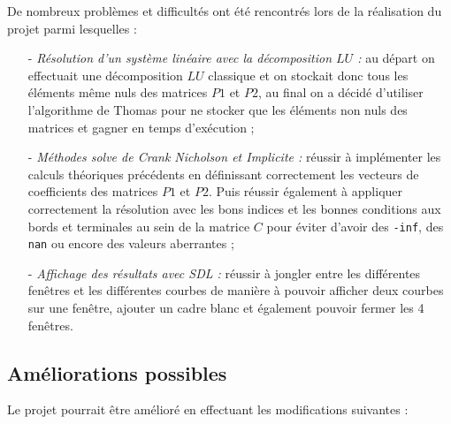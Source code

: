 \documentclass[11pt,a4paper]{article}
\begin{document}
\noindent
De nombreux problèmes et difficultés ont été rencontrés lors de la réalisation du projet parmi lesquelles :

\vspace{0.5cm}

\begin{itemize}
    \item[-] \emph{Résolution d'un système linéaire avec la décomposition $LU$ :} au départ on effectuait une décomposition $LU$ classique et on stockait donc tous les éléments même nuls des matrices $P1$ et $P2$, au final on a décidé d'utiliser l'algorithme de Thomas pour ne stocker que les éléments non nuls des matrices et gagner en temps d'exécution ;\vspace{0.5cm}
    \item[-] \emph{Méthodes solve de Crank Nicholson et Implicite :} réussir à implémenter les calculs théoriques précédents en définissant correctement les vecteurs de coefficients des matrices $P1$ et $P2$. Puis réussir également à appliquer correctement la résolution avec les bons indices et les bonnes conditions aux bords et terminales au sein de la matrice $C$ pour éviter d'avoir des \verb|-inf|, des \verb|nan| ou encore des valeurs aberrantes ;\vspace{0.5cm}
    \item[-] \emph{Affichage des résultats avec SDL :} réussir à jongler entre les différentes fenêtres et les différentes courbes de manière à pouvoir afficher deux courbes sur une fenêtre, ajouter un cadre blanc et également pouvoir fermer les 4 fenêtres.
\end{itemize}

\vspace{1cm}

\subsection{Améliorations possibles}

\noindent
Le projet pourrait être amélioré en effectuant les modifications suivantes :

\vspace{0.5cm}
\end{document}
